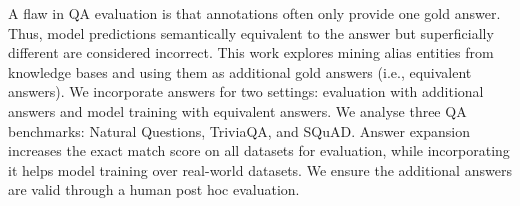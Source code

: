 A flaw in QA evaluation is that annotations often only provide one gold answer. Thus, model predictions semantically equivalent to the answer but superficially different are considered incorrect. This work explores mining alias entities from knowledge bases and using them as additional gold answers (i.e., equivalent answers). We incorporate answers for two settings: evaluation with additional answers and model training with equivalent answers. We analyse three QA benchmarks: Natural Questions, TriviaQA, and SQuAD. Answer expansion increases the exact match score on all datasets for evaluation, while incorporating it helps model training over real-world datasets. We ensure the additional answers are valid through a human post hoc evaluation.
